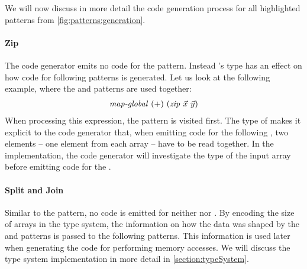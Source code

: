 We will now discuss in more detail the code generation process for all highlighted patterns from \autoref{fig:patterns:generation}.

\paragraph{Zip}
The code generator emits no \OpenCL code for the \zip pattern.
Instead \zip's type has an effect on how code for following patterns is generated.
Let us look at the following example, where the \zip and \mapGlobal patterns are used together:
\begin{align}
  \text{\textit{map-global}}\ (+)\ (\text{\textit{zip}}\ \vec{x}\ \vec{y})
\end{align}
When processing this expression, the \zip pattern is visited first.
The type of \zip makes it explicit to the code generator that, when emitting code for the following \mapGlobal, two elements -- one element from each array -- have to be read together.
In the implementation, the code generator will investigate the type of the input array before emitting code for the \mapGlobal.

\paragraph{Split and Join}
Similar to the \zip pattern, no \OpenCL code is emitted for neither \splitN nor \join.
By encoding the size of arrays in the type system, the information on how the data was shaped by the \splitN and \join patterns is passed to the following patterns.
This information is used later when generating the \OpenCL code for performing \OpenCL memory accesses. 
We will discuss the type system implementation in more detail in \autoref{section:typeSystem}.

